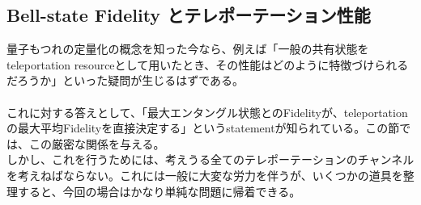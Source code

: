 \documentclass[a4paper,10.5pt]{article}
\numberwithin{equation}{section}
\begin{document}
\subsection{Bell-state Fidelity とテレポーテーション性能}
量子もつれの定量化の概念を知った今なら、例えば「一般の共有状態をteleportation resourceとして用いたとき、その性能はどのように特徴づけられるだろうか」といった疑問が生じるはずである。\\
\\
これに対する答えとして、「最大エンタングル状態とのFidelityが、teleportationの最大平均Fidelityを直接決定する」というstatementが知られている\cite{}。この節では、この厳密な関係を与える。\\
しかし、これを行うためには、考えうる全てのテレポーテーションのチャンネルを考えねばならない。これには一般に大変な労力を伴うが、いくつかの道具を整理すると、今回の場合はかなり単純な問題に帰着できる。
\end{document}
